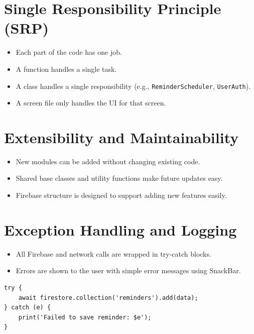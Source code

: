 \section{Single Responsibility Principle (SRP)}
\begin{itemize}
    \item Each part of the code has one job.
    \item A function handles a single task.
    \item A class handles a single responsibility (e.g., \texttt{ReminderScheduler}, \texttt{UserAuth}).
    \item A screen file only handles the UI for that screen.
\end{itemize}

\section{Extensibility and Maintainability}
\begin{itemize}
    \item New modules can be added without changing existing code.
    \item Shared base classes and utility functions make future updates easy.
    \item Firebase structure is designed to support adding new features easily.
\end{itemize}

\section{Exception Handling and Logging}
\begin{itemize}
    \item All Firebase and network calls are wrapped in try-catch blocks.
    \item Errors are shown to the user with simple error messages using SnackBar.
\end{itemize}

\begin{lstlisting}
try {
    await firestore.collection('reminders').add(data);
} catch (e) {
    print('Failed to save reminder: $e');
}
\end{lstlisting}
